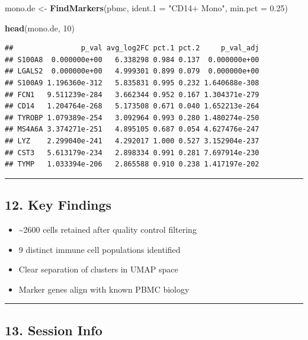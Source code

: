 \documentclass[
]{article}
\newenvironment{Shaded}{\begin{snugshade}}{\end{snugshade}}
\newcommand{\AttributeTok}[1]{\textcolor[rgb]{0.13,0.29,0.53}{#1}}
\newcommand{\DecValTok}[1]{\textcolor[rgb]{0.00,0.00,0.81}{#1}}
\newcommand{\FloatTok}[1]{\textcolor[rgb]{0.00,0.00,0.81}{#1}}
\newcommand{\FunctionTok}[1]{\textcolor[rgb]{0.13,0.29,0.53}{\textbf{#1}}}
\newcommand{\NormalTok}[1]{#1}
\newcommand{\OtherTok}[1]{\textcolor[rgb]{0.56,0.35,0.01}{#1}}
\newcommand{\StringTok}[1]{\textcolor[rgb]{0.31,0.60,0.02}{#1}}
\providecommand{\tightlist}{%
  \setlength{\itemsep}{0pt}\setlength{\parskip}{0pt}}
\begin{document}
\begin{Shaded}
\begin{Highlighting}[]
\NormalTok{mono.de }\OtherTok{\textless{}{-}} \FunctionTok{FindMarkers}\NormalTok{(pbmc, }\AttributeTok{ident.1 =} \StringTok{"CD14+ Mono"}\NormalTok{, }\AttributeTok{min.pct =} \FloatTok{0.25}\NormalTok{)}

\FunctionTok{head}\NormalTok{(mono.de, }\DecValTok{10}\NormalTok{)}
\end{Highlighting}
\end{Shaded}

\begin{verbatim}
##                p_val avg_log2FC pct.1 pct.2     p_val_adj
## S100A8  0.000000e+00   6.338298 0.984 0.137  0.000000e+00
## LGALS2  0.000000e+00   4.999301 0.899 0.079  0.000000e+00
## S100A9 1.196360e-312   5.835831 0.995 0.232 1.640688e-308
## FCN1   9.511239e-284   3.662344 0.952 0.167 1.304371e-279
## CD14   1.204764e-268   5.173508 0.671 0.040 1.652213e-264
## TYROBP 1.079389e-254   3.092964 0.993 0.280 1.480274e-250
## MS4A6A 3.374271e-251   4.895105 0.687 0.054 4.627476e-247
## LYZ    2.299040e-241   4.292017 1.000 0.527 3.152904e-237
## CST3   5.613179e-234   2.898334 0.991 0.281 7.697914e-230
## TYMP   1.033394e-206   2.865588 0.910 0.238 1.417197e-202
\end{verbatim}

\begin{center}\rule{0.5\linewidth}{0.5pt}\end{center}

\subsection{12. Key Findings}\label{key-findings}

\begin{itemize}
\tightlist
\item
  \textasciitilde2600 cells retained after quality control filtering
\item
  9 distinct immune cell populations identified
\item
  Clear separation of clusters in UMAP space
\item
  Marker genes align with known PBMC biology
\end{itemize}

\begin{center}\rule{0.5\linewidth}{0.5pt}\end{center}

\subsection{13. Session Info}\label{session-info}
\end{document}

